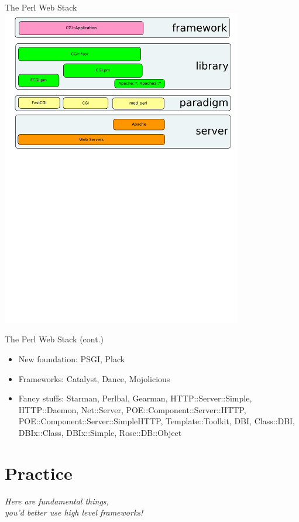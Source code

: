 \documentclass{beamer}
\begin{document}
\begin{frame}{The Perl Web Stack}
  \includegraphics[height=14cm]{perl-web-stack}
\end{frame}

\begin{frame}{The Perl Web Stack (cont.)}
  \begin{itemize}
    \item New foundation: PSGI, Plack
    \item Frameworks: Catalyst, Dance, Mojolicious
    \item Fancy stuffs: Starman, Perlbal, Gearman, HTTP::Server::Simple,
          HTTP::Daemon, Net::Server, POE::Component::Server::HTTP,
          POE::Component::Server::SimpleHTTP, Template::Toolkit, DBI,
          Class::DBI, DBIx::Class, DBIx::Simple, Rose::DB::Object
  \end{itemize}
\end{frame}


\section{Practice}

\begin{frame}
  \begin{center}
    {\Large\emph{Here are fundamental things, \\
            you'd better use high level frameworks!}}
  \end{center}
\end{frame}
\end{document}
